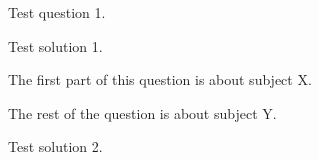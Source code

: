 \documentclass[online]{uob-cs-exam} %
\begin{document}
\maketitle

  \begin{questions}

    \question[10] Test question 1.

    \begin{solution}
      Test solution 1.
    \end{solution}

    \question[10]
      The first part of this question is about subject X.

      The rest of the question is about subject Y.

    \begin{solution}
      Test solution 2.
    \end{solution}

  \end{questions}

  \nomorequestions
\end{document}
